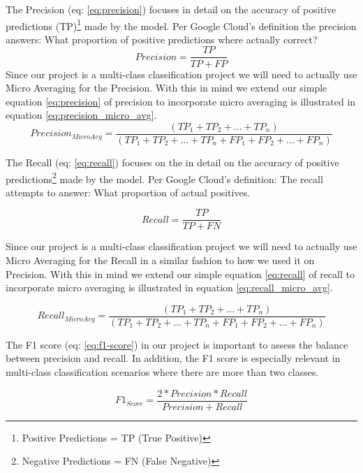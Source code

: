 \documentclass[11pt]{article}
\begin{document}
The Precision (eq: \ref{eq:precision}) focuses in detail on the accuracy of positive predictions (TP)\footnote{Positive Predictions = TP (True Positive)} made by the model. Per Google Cloud's definition the precision answers: What proportion of positive predictions where actually correct?
\begin{equation}
Precision = \frac{TP}{TP+FP}
\label{eq:precision}
\end{equation}
Since our project is a multi-class classification project we will need to actually use Micro Averaging for the Precision. With this in mind we extend our simple equation \ref{eq:precision} of precision to incorporate micro averaging is illustrated in equation \ref{eq:precision_micro_avg}.
\begin{equation}
Precision_{MicroAvg} = \frac{(TP_1 + TP_2 + \ldots + TP_n)}{(TP_1 + TP_2 + \ldots + TP_n + FP_1 + FP_2 + \ldots + FP_n)}
\label{eq:precision_micro_avg}
\end{equation}

The Recall (eq: \ref{eq:recall}) focuses on the in detail on the accuracy of positive predictions\footnote{Negative Predictions = FN (False Negative)} made by the model. Per Google Cloud's definition: The recall attempts to answer: What proportion of actual positives.

\begin{equation}
Recall = \frac{TP}{TP+FN}
\label{eq:recall}
\end{equation}

Since our project is a multi-class classification project we will need to actually use Micro Averaging for the Recall in a similar fashion to how we used it on Precision. With this in mind we extend our simple equation \ref{eq:recall} of recall to incorporate micro averaging is illustrated in equation \ref{eq:recall_micro_avg}.

\begin{equation}
Recall_{MicroAvg} = \frac{(TP_1 + TP_2 + \ldots + TP_n)}{(TP_1 + TP_2 + \ldots + TP_n + FP_1 + FP_2 + \ldots + FP_n)}
\label{eq:recall_micro_avg}
\end{equation}

The F1 score (eq: \ref{eq:f1-score}) in our project is important to assess the balance between precision and recall. In addition, the F1 score is especially relevant in multi-class classification scenarios where there are more than two classes.

\begin{equation}
F1_{Score} = \frac{2*Precision*Recall}{Precision+Recall}
\label{eq:f1-score}
\end{equation}
\end{document}
